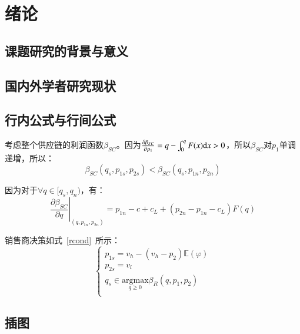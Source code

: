 \chapter{绪论}

\section{课题研究的背景与意义}

\section{国内外学者研究现状}






\section{行内公式与行间公式}

考虑整个供应链的利润函数$\beta_{SC}$。因为$\frac{\partial\beta_{SC}}{\partial p_1}=q-\int_0^q F(x)\mathrm{d} x>0$，所以$\beta_{SC}$对$p_1$单调递增，所以：
\begin{equation}
\label{dscNoStgProof0}
\beta_{SC}(q_s,p_{1s},p_{2s})<\beta_{SC}(q_s,p_{1n},p_{2n})
\end{equation}

因为对于$\forall q\in[q_s, q_n)$，有：
\[ \left.\frac{\partial \beta_{SC}}{\partial q}\right|_{(q,p_{1n},p_{2n})}=p_{1n}-c+c_L+(p_{2n}-p_{1n}-c_L)F(q) \]

销售商决策如式~\eqref{rcond}~所示：
\begin{equation}
\label{rcond}
\left\{\begin{array}{l}
p_{1s}=v_h-(v_h-p_2)\mathbb{E}(\varphi) \\
p_{2s}=v_l \\
q_s \in \underset{q \geq 0}{\mathrm{argmax}} \beta_R (q, p_1, p_2) \\
\end{array}\right.
\end{equation}

\section{插图}

